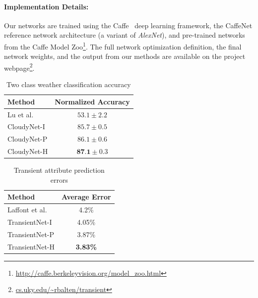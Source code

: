 \documentclass[10pt,twocolumn,letterpaper]{article}
\newcommand{\todo}[1]{\textcolor{red}{todo: {\em #1}}}
\begin{document}
%

\vspace{-1em}
\paragraph{Implementation Details:} Our networks are trained using the
Caffe~\cite{caffe14} deep learning framework, the CaffeNet reference network
architecture (a variant of \emph{AlexNet}), and pre-trained networks from the Caffe
Model Zoo\footnote{\url{http://caffe.berkeleyvision.org/model_zoo.html}}.  The
full network optimization definition, the final network weights, and the output
from our methods are available on the project webpage\footnote{\url{cs.uky.edu/~rbalten/transient}}.


\begin{table}[t]
	\centering
	\caption{Two class weather classification accuracy}
	\begin{tabular}{ | l | c | }
		\hline
			Method & Normalized Accuracy \\ \hline \hline
			Lu et al.~\cite{lutwoclass}& $ 53.1 \pm 2.2 $ \\ \hline
			CloudyNet-I & $ 85.7 \pm 0.5 $ \\ \hline
			CloudyNet-P & $ 86.1 \pm 0.6 $ \\ \hline
			CloudyNet-H & $ \textbf{87.1} \pm 0.3 $ \\ 
		\hline
	\end{tabular}
	\label{tbl:twoclass}
\end{table}

\begin{table}[t]
	\centering
	\caption{Transient attribute prediction errors}
	\begin{tabular}{ | l | c | }
		\hline
			Method & Average Error \\ \hline \hline
			Laffont et al.~\cite{Laffont14}& 4.2\% \\ \hline
			TransientNet-I & 4.05\% \\ \hline
			TransientNet-P & 3.87\% \\ \hline
			TransientNet-H & \textbf{3.83\%} \\ 
		\hline
	\end{tabular}
	\label{tbl:transient}
\end{table}
\end{document}
